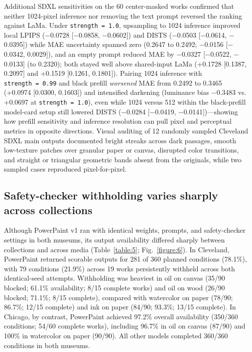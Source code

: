\documentclass[fleqn,12pt,lineno]{wlpeerj}
\begin{document}
Additional SDXL sensitivities on the 60 center-masked works confirmed that neither 1024-pixel inference nor removing the text prompt reversed the ranking against LaMa. Under \texttt{strength\ =\ 1.0}, upsampling to 1024 inference improved local LPIPS (\ensuremath{-}0.0728 {[}\ensuremath{-}0.0858, \ensuremath{-}0.0602{]}) and DISTS (\ensuremath{-}0.0503 {[}\ensuremath{-}0.0614, \ensuremath{-}0.0395{]}) while MAE uncertainty spanned zero (0.2647 to 0.2492; \ensuremath{-}0.0156 {[}\ensuremath{-}0.0342, 0.0029{]}), and an empty prompt reduced MAE by \ensuremath{-}0.0327 {[}\ensuremath{-}0.0522, \ensuremath{-}0.0133{]} (to 0.2320); both stayed well above shared-input LaMa (+0.1728 {[}0.1387, 0.2097{]} and +0.1519 {[}0.1261, 0.1801{]}). Pairing 1024 inference with \texttt{strength\ =\ 0.99} and black prefill \emph{worsened} MAE from 0.2492 to 0.3465 (+0.0974 {[}0.0300, 0.1603{]}) and intensified darkening (luminance bias \ensuremath{-}0.3483 vs. +0.0697 at \texttt{strength\ =\ 1.0}), even while 1024 versus 512 within the black-prefill model-card setup still lowered DISTS (\ensuremath{-}0.0284 {[}\ensuremath{-}0.0419, \ensuremath{-}0.0141{]})---showing how prefill sensitivity and inference resolution can pull pixel and perceptual metrics in opposite directions. Visual auditing of 12 randomly sampled Cleveland SDXL main outputs documented bright streaks across dark passages, smooth low-texture patches over granular paper or canvas, disrupted color transitions, and straight or triangular geometric bands absent from the originals, while two sampled cases reproduced pixel-for-pixel.

\subsection{Safety-checker withholding varies sharply across collections}\label{safety-checker-withholding-varies-sharply-across-collections}

Although PowerPaint v1 ran with identical weights, prompts, and safety-checker settings in both museums, its output availability differed sharply between collections and across media (Table~\ref{table:5}; Fig.~\ref{figure:6}). In Cleveland, PowerPaint returned scorable outputs for 281 of 360 planned conditions (78.1\%), with 79 conditions (21.9\%) across 19 works persistently withheld across both identical-seed attempts. Withholding was heaviest in oil on canvas (35/90 blocked; 61.1\% availability; 8/15 complete works) and oil on wood (26/90 blocked; 71.1\%; 8/15 complete), compared with watercolor on paper (78/90; 86.7\%; 12/15 complete) and ink on paper (84/90; 93.3\%; 13/15 complete). In Chicago, by contrast, PowerPaint achieved 97.2\% overall availability (350/360 conditions; 54/60 complete works), including 96.7\% in oil on canvas (87/90) and 100\% in watercolor on paper (90/90). All other models completed 360/360 conditions in both museums.
\end{document}

